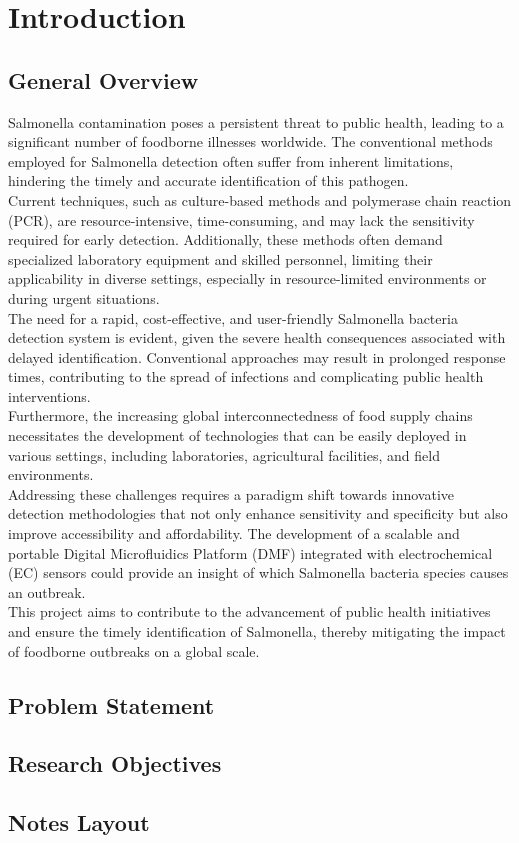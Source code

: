 \chapter{Introduction}
\section{General Overview}
Salmonella contamination poses a persistent threat to public health, leading to a significant
number of foodborne illnesses worldwide. The conventional methods employed for Salmonella detection often suffer from inherent limitations, hindering the timely and accurate identification of this pathogen.\\

Current techniques, such as culture-based methods and polymerase chain reaction (PCR), are resource-intensive, time-consuming, and may lack  the sensitivity required for early detection. Additionally, these methods often demand specialized laboratory equipment and skilled personnel, limiting their applicability in diverse settings, especially in resource-limited environments or during urgent situations.\\

The need for a rapid, cost-effective, and user-friendly Salmonella bacteria detection system is evident, given the severe health consequences associated with delayed identification. Conventional approaches may result in prolonged response times, contributing to the spread of infections and complicating public health interventions. \\

Furthermore, the increasing global interconnectedness of food supply chains necessitates the development of technologies that can be easily deployed in various settings, including laboratories, agricultural facilities, and field environments.\\

Addressing these challenges requires a paradigm shift towards innovative detection methodologies
that not only enhance sensitivity and specificity but also improve accessibility and affordability. The development of a scalable and portable Digital Microfluidics Platform (DMF) integrated with electrochemical (EC) sensors could provide an insight of which Salmonella bacteria species causes an outbreak.\\

This project aims to contribute to the advancement of public health initiatives and ensure the timely identification of Salmonella, thereby mitigating the impact of foodborne outbreaks on a global scale.

\section{Problem Statement}
\section{Research Objectives}
\section{Notes Layout}